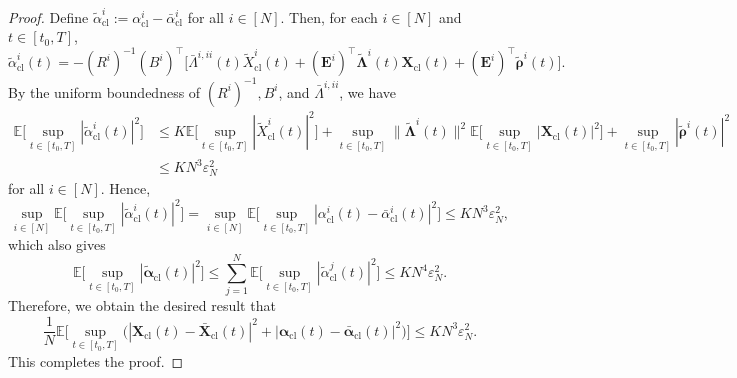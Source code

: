 \documentclass[10pt,a4paper]{amsart}
\newcommand{\cl}{\mathrm{cl}}
\def\wt{\widetilde}
\begin{document}
\begin{proof}
Define $\wt{\alpha}_{\cl}^i := \alpha_{\cl}^i - \bar{\alpha}_{\cl}^i$ for all $i \in [N]$. Then, for each $i \in [N]$ and $t \in [t_0, T]$,
$$\wt{\alpha}_{\cl}^i(t) = - (R^i)^{-1} (B^i)^\top \big[\bar{\Lambda}^{i,ii}(t) \wt{X}_{\cl}^i(t) + (\bm{E}^i)^\top \wt{\bm{\Lambda}}^i(t) \bm{X}_{\cl}(t) + (\bm{E}^i)^\top \wt{\bm{\rho}}^i(t) \big].$$
By the uniform boundedness of $(R^i)^{-1}, B^i$, and $\bar{\Lambda}^{i,ii}$, we have
\begin{equation*}
\begin{aligned}
\mathbb{E} \Big[\sup_{t \in[t_0,T]}|\wt{\alpha}_{\cl}^i(t)|^2 \Big] & \leq K \mathbb{E}\Big[\sup_{t \in[t_0,T]} |\wt{X}^i_{\cl}(t)|^2 \Big] + \sup_{t \in[t_0,T]} \|\wt{\bm{\Lambda}}^i(t)\|^2 \mathbb{E} \Big[\sup_{t \in[t_0,T]}|\bm{X}_{\cl}(t)|^2 \Big] + \sup_{t \in[t_0,T]} |\wt{\bm{\rho}}^i(t)|^2 \\
& \leq KN^3 \varepsilon_N^2
\end{aligned}
\end{equation*}
for all $i \in [N]$. Hence,
$$\sup_{i \in [N]} \mathbb{E} \Big[\sup_{t \in[t_0,T]}|\wt{\alpha}_{\cl}^i(t)|^2 \Big] = \sup_{i \in [N]} \mathbb{E} \Big[\sup_{t \in[t_0,T]}|\alpha_{\cl}^i(t) - \bar{\alpha}_{\cl}^i(t)|^2 \Big] \leq KN^3 \varepsilon_N^2,$$
which also gives
$$\mathbb{E} \Big[\sup_{t \in [t_0, T]} |\wt{\bm{\alpha}}_{\cl}(t)|^2 \Big] \leq \sum_{j=1}^N \mathbb{E} \Big[\sup_{t \in [t_0, T]} |\wt{\alpha}^j_{\cl}(t)|^2 \Big] \leq KN^4 \varepsilon_N^2.$$
Therefore, we obtain the desired result that
\begin{equation*}
\frac{1}{N} \mathbb{E} \Big[\sup_{t \in [t_0, T]} \big(|\bm{X}_{\cl}(t) - \bar{\bm{X}}_{\cl}(t)|^2 + |\bm{\alpha}_{\cl}(t) - \bar{\bm{\alpha}}_{\cl}(t)|^2 \big) \Big] \leq KN^3 \varepsilon_N^2.
\end{equation*}
This completes the proof.
\end{proof}
\end{document}
